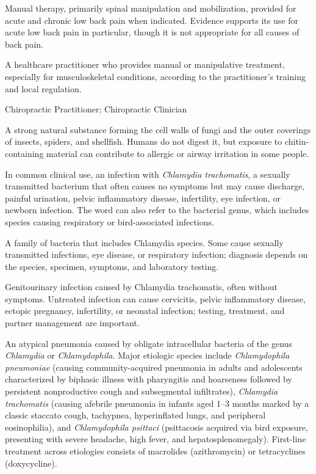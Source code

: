  Manual therapy, primarily spinal manipulation and mobilization, provided for acute and chronic low back pain when indicated. Evidence supports its use for acute low back pain in particular, though it is not appropriate for all causes of back pain.

 A healthcare practitioner who provides manual or manipulative treatment, especially for musculoskeletal conditions, according to the practitioner's training and local regulation.

\synonyms
Chiropractic Practitioner; Chiropractic Clinician

 A strong natural substance forming the cell walls of fungi and the outer coverings of insects, spiders, and shellfish. Humans do not digest it, but exposure to chitin-containing material can contribute to allergic or airway irritation in some people.

 In common clinical use, an infection with \textit{Chlamydia trachomatis}, a sexually transmitted bacterium that often causes no symptoms but may cause discharge, painful urination, pelvic inflammatory disease, infertility, eye infection, or newborn infection. The word can also refer to the bacterial genus, which includes species causing respiratory or bird-associated infections.

 A family of bacteria that includes Chlamydia species. Some cause sexually transmitted infections, eye disease, or respiratory infection; diagnosis depends on the species, specimen, symptoms, and laboratory testing.

 Genitourinary infection caused by Chlamydia trachomatis, often without symptoms. Untreated infection can cause cervicitis, pelvic inflammatory disease, ectopic pregnancy, infertility, or neonatal infection; testing, treatment, and partner management are important.

 An atypical pneumonia caused by obligate intracellular bacteria of the genus \textit{Chlamydia} or \textit{Chlamydophila}. Major etiologic species include \textit{Chlamydophila pneumoniae} (causing community-acquired pneumonia in adults and adolescents characterized by biphasic illness with pharyngitis and hoarseness followed by persistent nonproductive cough and subsegmental infiltrates), \textit{Chlamydia trachomatis} (causing afebrile pneumonia in infants aged 1--3 months marked by a classic staccato cough, tachypnea, hyperinflated lungs, and peripheral eosinophilia), and \textit{Chlamydophila psittaci} (psittacosis acquired via bird exposure, presenting with severe headache, high fever, and hepatosplenomegaly). First-line treatment across etiologies consists of macrolides (azithromycin) or tetracyclines (doxycycline).

